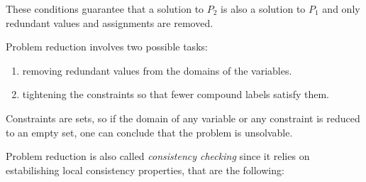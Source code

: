 These conditions guarantee that a solution to $P_2$ is also a solution to $P_1$
and only redundant values and assignments are removed.

Problem reduction involves two possible tasks:
\begin{enumerate}
    \item removing redundant values from the domains of the variables. 
    \item tightening the constraints so that fewer compound labels satisfy them.
\end{enumerate}
Constraints are sets, so if the domain of any variable or any constraint
is reduced to an empty set, one can  conclude that the problem is
unsolvable.

Problem reduction is also called \emph{consistency checking} since it relies
on estabilishing local consistency properties, that are the following:
